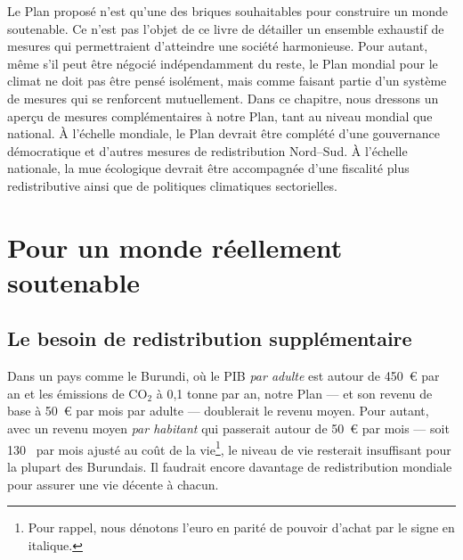 \documentclass[a5paper,french,openany]{memoir}
\begin{document}
Le Plan proposé n'est qu'une des briques souhaitables pour construire un monde soutenable. Ce n'est pas l'objet de ce livre %
de détailler un ensemble exhaustif de mesures qui permettraient d'atteindre une société harmonieuse. Pour autant, même s'il peut être négocié indépendamment du reste, le Plan mondial pour le climat ne doit pas être pensé isolément, mais comme faisant partie d'un système de mesures qui se renforcent mutuellement. Dans ce chapitre, nous dressons un aperçu de mesures complémentaires à notre Plan, tant au niveau mondial que national. À l'échelle mondiale, le Plan devrait être complété d'une gouvernance démocratique et d'autres mesures de redistribution Nord--Sud. À l'échelle nationale, la mue écologique devrait être accompagnée d'une fiscalité plus redistributive ainsi que de politiques climatiques sectorielles. 

\section{Pour un monde réellement soutenable}

\subsection{Le besoin de redistribution supplémentaire}
Dans un pays comme le Burundi, où le PIB \textit{par adulte} est autour de 450~\euro{} par an et les émissions de CO$_\text{2}$ à 0,1 tonne par an, notre Plan --- et son revenu de base à 50~\euro{} par mois par adulte --- doublerait le revenu moyen. 
Pour autant, avec un revenu moyen \textit{par habitant} qui passerait autour de 50~\euro{} par mois --- soit 130~\textit{\texteuro{}} par mois ajusté au coût de la vie\footnote{Pour rappel, nous dénotons l'euro en parité de pouvoir d'achat par le signe \textit{\texteuro{}} en italique.}, 
le niveau de vie resterait insuffisant pour la plupart des Burundais. Il faudrait encore davantage de redistribution mondiale pour assurer une vie décente à chacun. 
\end{document}
